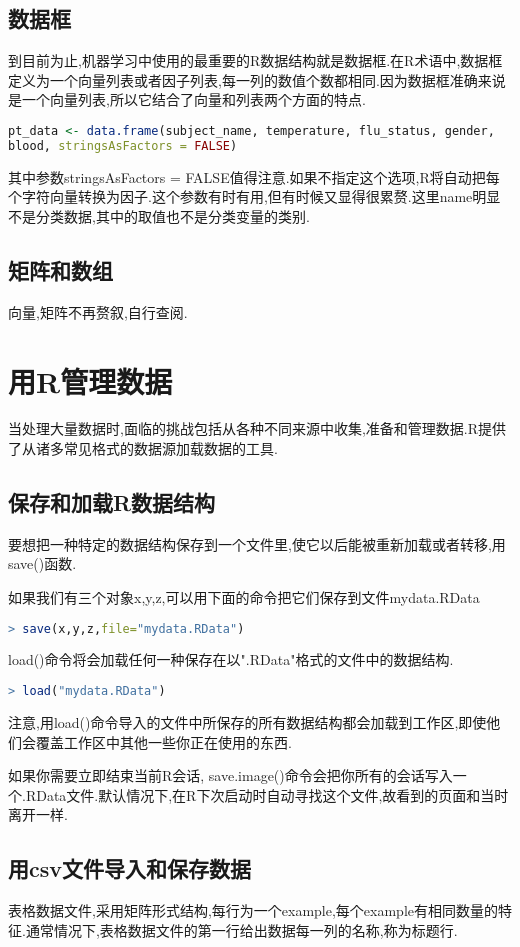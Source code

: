 \documentclass[11pt,a4paper,oneside]{book}
\begin{document}
\subsection{数据框}
到目前为止,机器学习中使用的最重要的R数据结构就是数据框.在R术语中,数据框定义为一个向量列表或者因子列表,每一列的数值个数都相同.因为数据框准确来说是一个向量列表,所以它结合了向量和列表两个方面的特点.
\begin{lstlisting}[language=r]
pt_data <- data.frame(subject_name, temperature, flu_status, gender,
blood, stringsAsFactors = FALSE)
\end{lstlisting}
其中参数stringsAsFactors = FALSE值得注意.如果不指定这个选项,R将自动把每个字符向量转换为因子.这个参数有时有用,但有时候又显得很累赘.这里name明显不是分类数据,其中的取值也不是分类变量的类别.

\subsection{矩阵和数组}
向量,矩阵不再赘叙,自行查阅.

\section{用R管理数据}
当处理大量数据时,面临的挑战包括从各种不同来源中收集,准备和管理数据.R提供了从诸多常见格式的数据源加载数据的工具.
\subsection{保存和加载R数据结构}
要想把一种特定的数据结构保存到一个文件里,使它以后能被重新加载或者转移,用save()函数.

如果我们有三个对象x,y,z,可以用下面的命令把它们保存到文件mydata.RData
\begin{lstlisting}[language=r]
> save(x,y,z,file="mydata.RData")
\end{lstlisting}
load()命令将会加载任何一种保存在以".RData"格式的文件中的数据结构.
\begin{lstlisting}[language=r]
> load("mydata.RData")
\end{lstlisting}
\begin{tcolorbox}[colback=pink!10!white,colframe=pink!100!black]
注意,用load()命令导入的文件中所保存的所有数据结构都会加载到工作区,即使他们会覆盖工作区中其他一些你正在使用的东西.
\end{tcolorbox}
如果你需要立即结束当前R会话, save.image()命令会把你所有的会话写入一个.RData文件.默认情况下,在R下次启动时自动寻找这个文件,故看到的页面和当时离开一样.
\subsection{用csv文件导入和保存数据}
表格数据文件,采用矩阵形式结构,每行为一个example,每个example有相同数量的特征.通常情况下,表格数据文件的第一行给出数据每一列的名称,称为标题行.
\end{document}
